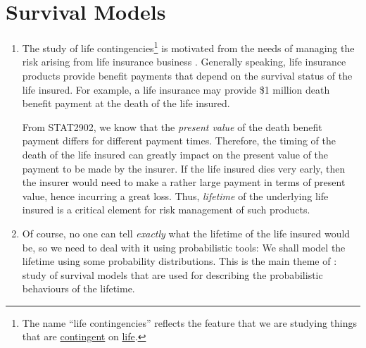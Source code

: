 \section{Survival Models}
\label{sect:surv-models}
\begin{enumerate}
\item The study of life contingencies\footnote{The name ``life
contingencies'' reflects the feature that we are studying things that are
\underline{contingent} on \underline{life}.} is motivated from the needs of
managing the risk arising from life insurance business .
Generally speaking, life insurance products provide benefit payments that
depend on the survival status of the life insured. For example, a life
insurance may provide \$1 million death benefit payment at the death
 of the life insured.

From STAT2902, we know that the \emph{present value} of the death benefit
payment differs for different payment times. Therefore, the timing of the death
of the life insured can greatly impact on the present value of the payment to
be made by the insurer. If the life insured dies very early, then the insurer
would need to make a rather large payment in terms of present value, hence
incurring a great loss. Thus, \emph{lifetime} of the underlying life insured is
a critical element for risk management of such products.

\item Of course, no one can tell \emph{exactly} what the lifetime of the life
insured would be, so we need to deal with it using probabilistic tools: We
shall model the lifetime using some probability distributions. This is the main
theme of : study of survival models that are used for
describing the probabilistic behaviours of the lifetime.

\end{enumerate}

